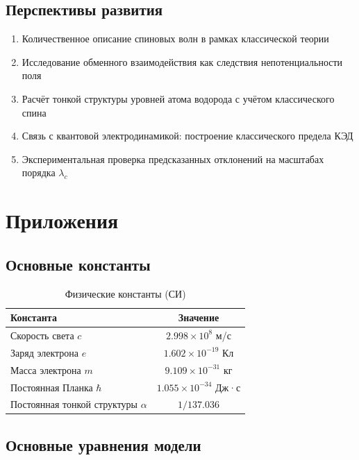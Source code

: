 \documentclass[12pt,a4paper]{article}
\begin{document}
\subsection{Перспективы развития}

\begin{enumerate}
    \item Количественное описание спиновых волн в рамках классической теории
    \item Исследование обменного взаимодействия как следствия непотенциальности поля
    \item Расчёт тонкой структуры уровней атома водорода с учётом классического спина
    \item Связь с квантовой электродинамикой: построение классического предела КЭД
    \item Экспериментальная проверка предсказанных отклонений на масштабах порядка $\lambda_c$
\end{enumerate}

\section{Приложения}

\subsection{Основные константы}

\begin{table}[h]
\centering
\caption{Физические константы (СИ)}
\label{tab:constants}
\begin{tabular}{lc}
\toprule
\textbf{Константа} & \textbf{Значение} \\
\midrule
Скорость света $c$ & $2.998 \times 10^8$ м/с \\
Заряд электрона $e$ & $1.602 \times 10^{-19}$ Кл \\
Масса электрона $m$ & $9.109 \times 10^{-31}$ кг \\
Постоянная Планка $\hbar$ & $1.055 \times 10^{-34}$ Дж·с \\
Постоянная тонкой структуры $\alpha$ & $1/137.036$ \\
\bottomrule
\end{tabular}
\end{table}

\subsection{Основные уравнения модели}
\end{document}
